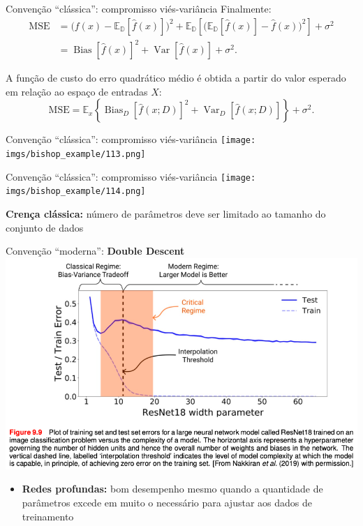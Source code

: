 \documentclass{beamer}
\begin{document}
\begin{frame}{Convenção ``clássica'': compromisso viés-variância}
  Finalmente:
\begin{align}
\mathrm{MSE}
&= \big(f(x) - \mathbb{E_D}[\hat{f}(x)]\big)^{2}
+ \mathbb{E_D}\!\left[\big(\mathbb{E_D}[\hat{f}(x)] - \hat{f}(x)\big)^{2}\right]
+ \sigma^{2} \\[1ex]
&= \operatorname{Bias}\!\left[\hat{f}(x)\right]^{2}
+ \operatorname{Var}\!\left[\hat{f}(x)\right]
+ \sigma^{2}.
\end{align}

A função de custo do erro quadrático médio 
é obtida a partir do valor esperado em relação ao espaço de entradas $X$:
\begin{equation}
\mathrm{MSE}
= \mathbb{E}_{x}\!\left\{
    \operatorname{Bias}_{D}\!\left[\hat{f}(x; D)\right]^{2}
    + \operatorname{Var}_{D}\!\left[\hat{f}(x; D)\right]
\right\}
+ \sigma^{2}.
\end{equation}
\end{frame}

\begin{frame}{Convenção ``clássica'': compromisso viés-variância}
\texttt{[image: imgs/bishop\_example/113.png]}
\end{frame}

\begin{frame}{Convenção ``clássica'': compromisso viés-variância}
\texttt{[image: imgs/bishop\_example/114.png]}

\textbf{Crença clássica:} número de parâmetros deve ser limitado ao tamanho do conjunto de dados
\end{frame}

\begin{frame}{Convenção ``moderna'': \textbf{Double Descent}} 
\includegraphics[width=\textwidth,height=0.7\textheight,keepaspectratio]{imgs/bishop_example/11.png}
  \begin{itemize}
  \item \textbf{Redes profundas:} bom desempenho mesmo quando a quantidade de parâmetros excede em muito o necessário para ajustar aos dados de treinamento 
\end{itemize}
\end{frame}
\end{document}
